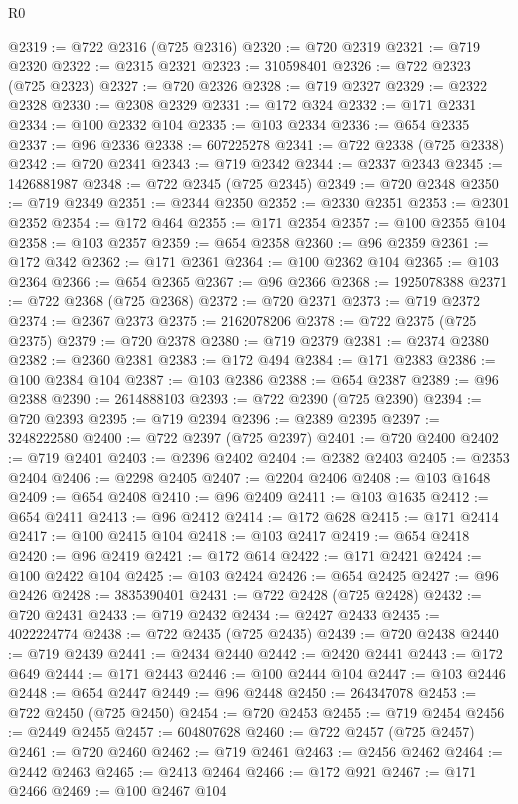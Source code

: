 \begin{lexlean}{R0}
\begin{coremodule}
@2319 := @722 @2316 (@725 @2316)
@2320 := @720 @2319
@2321 := @719 @2320
@2322 := @2315 @2321
@2323 := 310598401
@2326 := @722 @2323 (@725 @2323)
@2327 := @720 @2326
@2328 := @719 @2327
@2329 := @2322 @2328
@2330 := @2308 @2329
@2331 := @172 @324
@2332 := @171 @2331
@2334 := @100 @2332 @104
@2335 := @103 @2334
@2336 := @654 @2335
@2337 := @96 @2336
@2338 := 607225278
@2341 := @722 @2338 (@725 @2338)
@2342 := @720 @2341
@2343 := @719 @2342
@2344 := @2337 @2343
@2345 := 1426881987
@2348 := @722 @2345 (@725 @2345)
@2349 := @720 @2348
@2350 := @719 @2349
@2351 := @2344 @2350
@2352 := @2330 @2351
@2353 := @2301 @2352
@2354 := @172 @464
@2355 := @171 @2354
@2357 := @100 @2355 @104
@2358 := @103 @2357
@2359 := @654 @2358
@2360 := @96 @2359
@2361 := @172 @342
@2362 := @171 @2361
@2364 := @100 @2362 @104
@2365 := @103 @2364
@2366 := @654 @2365
@2367 := @96 @2366
@2368 := 1925078388
@2371 := @722 @2368 (@725 @2368)
@2372 := @720 @2371
@2373 := @719 @2372
@2374 := @2367 @2373
@2375 := 2162078206
@2378 := @722 @2375 (@725 @2375)
@2379 := @720 @2378
@2380 := @719 @2379
@2381 := @2374 @2380
@2382 := @2360 @2381
@2383 := @172 @494
@2384 := @171 @2383
@2386 := @100 @2384 @104
@2387 := @103 @2386
@2388 := @654 @2387
@2389 := @96 @2388
@2390 := 2614888103
@2393 := @722 @2390 (@725 @2390)
@2394 := @720 @2393
@2395 := @719 @2394
@2396 := @2389 @2395
@2397 := 3248222580
@2400 := @722 @2397 (@725 @2397)
@2401 := @720 @2400
@2402 := @719 @2401
@2403 := @2396 @2402
@2404 := @2382 @2403
@2405 := @2353 @2404
@2406 := @2298 @2405
@2407 := @2204 @2406
@2408 := @103 @1648
@2409 := @654 @2408
@2410 := @96 @2409
@2411 := @103 @1635
@2412 := @654 @2411
@2413 := @96 @2412
@2414 := @172 @628
@2415 := @171 @2414
@2417 := @100 @2415 @104
@2418 := @103 @2417
@2419 := @654 @2418
@2420 := @96 @2419
@2421 := @172 @614
@2422 := @171 @2421
@2424 := @100 @2422 @104
@2425 := @103 @2424
@2426 := @654 @2425
@2427 := @96 @2426
@2428 := 3835390401
@2431 := @722 @2428 (@725 @2428)
@2432 := @720 @2431
@2433 := @719 @2432
@2434 := @2427 @2433
@2435 := 4022224774
@2438 := @722 @2435 (@725 @2435)
@2439 := @720 @2438
@2440 := @719 @2439
@2441 := @2434 @2440
@2442 := @2420 @2441
@2443 := @172 @649
@2444 := @171 @2443
@2446 := @100 @2444 @104
@2447 := @103 @2446
@2448 := @654 @2447
@2449 := @96 @2448
@2450 := 264347078
@2453 := @722 @2450 (@725 @2450)
@2454 := @720 @2453
@2455 := @719 @2454
@2456 := @2449 @2455
@2457 := 604807628
@2460 := @722 @2457 (@725 @2457)
@2461 := @720 @2460
@2462 := @719 @2461
@2463 := @2456 @2462
@2464 := @2442 @2463
@2465 := @2413 @2464
@2466 := @172 @921
@2467 := @171 @2466
@2469 := @100 @2467 @104

\end{coremodule}
\end{lexlean}
